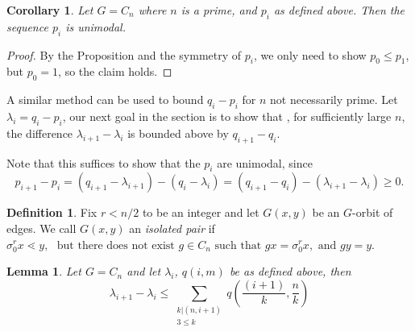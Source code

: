 \documentclass[10 pt]{amsart}
\theoremstyle{plain}
\newtheorem{lem}[thm]{Lemma}
\newtheorem{cor}[thm]{Corollary}
\theoremstyle{definition}
\newtheorem{defn}[thm]{Definition}
\theoremstyle{remark}
\numberwithin{equation}{section}
\begin{document}
\begin{cor}{\label{cor:cyclic_prime_unimodal}} Let $G = C_n$ where $n$ is a prime, and $p_i$ as defined above. Then the sequence $p_i$ is unimodal. 
\end{cor}

\begin{proof}
By the Proposition and the symmetry of $p_i$, we only need to show $p_0 \le p_1$, but $p_0 = 1$, so the claim holds.
\end{proof}

A similar method can be used to bound $q_i - p_i$ for $n$ not necessarily prime. Let $\lambda_i = q_i - p_i$, our next goal in the section is to show that ,  for sufficiently large $n$, the difference $\lambda_{i+1} - \lambda_{i}$ is bounded above by  $q_{i+1} - q_i$. 

Note that this suffices to show that the $p_i$ are unimodal, since $$p_{i+1} - p_{i} = (q_{i+1} - \lambda_{i+1}) - (q_i - \lambda_i) = (q_{i+1} - q_i) - (\lambda_{i+1}- \lambda_i) \ge 0.$$ 



\begin{defn}
Fix $r < n/2$ to be an integer and let $ G(x, y)$ be an $G$-orbit of edges. We call $G(x , y)$ an {\it isolated pair} if  $ \sigma_0^r x \lessdot y, \, \, \text{ but  there does not exist } g \in C_n \text{ such that } g x = \sigma_0 ^r x,  \text{ and }g y = y$. 
\end{defn}


\begin{lem}{\label{lem:cyclic_bounding_lambda}} 
Let $G =C_n$ and let $\lambda_i$, $q(i,m)$ be as defined above,  then $$\lambda_{i+1} - \lambda_i \le \sum_{\substack{k | (n , i+1) \\ 3 \le k }} q \left(\frac{(i+1)}{k},\frac{n}{k}\right) $$ 
\end{lem}
\end{document}
